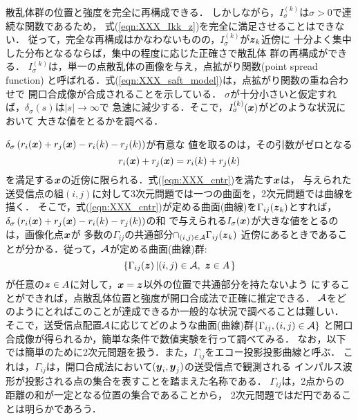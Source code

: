 散乱体群の位置と強度を完全に再構成できる．
しかしながら，$I_\sigma^{(k)}$は$\sigma>0$で連続な関数であるため，
式(\ref{eqn:XXX_Ikk_z})を完全に満足させることはできない．
従って，完全な再構成はかなわないものの，$I_\sigma^{(k)}$が$\mbox{\boldmath $z$}_k$近傍に
十分よく集中した分布となるならば，集中の程度に応じた正確さで散乱体
群の再構成ができる．
$I_\sigma^{(k)}$は，単一の点散乱体の画像を与え，点拡がり関数(point spread function)
と呼ばれる．式(\ref{eqn:XXX_saft_model})は，点拡がり関数の重ね合わせで
開口合成像が合成されることを示している．
$\sigma$が十分小さいと仮定すれば，$\delta_\sigma(s)$は$|s|\rightarrow \infty$で
急速に減少する．そこで，$I_\sigma^{(k)}(\mbox{\boldmath $x$})$がどのような状況において
大きな値をとるかを調べる．

$\delta_\sigma\left(r_i(\mbox{\boldmath $x$})+r_j(\mbox{\boldmath $x$})-r_i(k)-r_j(k)\right)$が有意な
値を取るのは，その引数がゼロとなる
\begin{equation}
	r_i(\mbox{\boldmath $x$})+r_j(\mbox{\boldmath $x$})=r_i(k)+r_j(k)
	\label{eqn:XXX_cntr}
\end{equation}
を満足する$\mbox{\boldmath $x$}$の近傍に限られる．式(\ref{eqn:XXX_cntr})を満たす$\mbox{\boldmath $x$}$は，
与えられた送受信点の組$(i,j)$に対して3次元問題では一つの曲面を，2次元問題では曲線を描く．
そこで，式(\ref{eqn:XXX_cntr})が定める曲面(曲線)を$\Gamma_{ij}(\mbox{\boldmath $z$}_k)$とすれば，
$\delta_\sigma\left(r_i(\mbox{\boldmath $x$})+r_j(\mbox{\boldmath $x$})-r_i(k)-r_j(k)\right)$の和
で与えられる$I_\sigma(\mbox{\boldmath $x$})$が大きな値をとるのは，画像化点$\mbox{\boldmath $x$}$が
多数の$\Gamma_{ij}$の共通部分$\cap_{(i,j) \in {\cal A}} \Gamma_{ij}(\mbox{\boldmath $z$}_k)$
近傍にあるときであることが分かる．従って，$\cal A$が定める曲面(曲線)群:
\begin{equation}
	\left\{ \Gamma_{ij}(\mbox{\boldmath $z$})\left|  (i,j)\in {\cal A} ,\,\, \mbox{\boldmath $z$} \in A \right.\right\}
	\label{eqn:XXX_Crvs}
\end{equation}
が任意の$\mbox{\boldmath $z$}\in A$に対して，$\mbox{\boldmath $x$}=\mbox{\boldmath $z$}$以外の位置で共通部分を持たないよう
にすることができれば，点散乱体位置と強度が開口合成法で正確に推定できる．
$\cal A$をどのようにとればこのことが達成できるか一般的な状況で調べることは難しい．
そこで，送受信点配置$\cal A$に応じてどのような曲面(曲線)群$\{\Gamma_{ij},(i,j)\in {\cal A}\}$
と開口合成像が得られるか，簡単な条件で数値実験を行って調べてみる．
なお，以下では簡単のために2次元問題を扱う．また，$\Gamma_{ij}$をエコー投影投影曲線と呼ぶ．
これは，$\Gamma_{ij}$は，開口合成法において$(\mbox{\boldmath $y$}_i,\mbox{\boldmath $y$}_j)$の送受信点で観測される
インパルス波形が投影される点の集合を表すことを踏まえた名称である．
$\Gamma_{ij}$は，2点からの距離の和が一定となる位置の集合であることから，
2次元問題ではだ円であることは明らかであろう．
